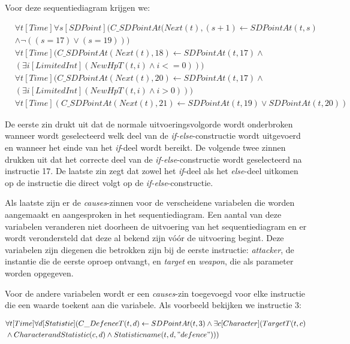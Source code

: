 Voor deze sequentiediagram krijgen we:

\begin{align*}
	&\forall{t}[Time]\forall{s}[SDPoint](C\_SDPointAt(Next(t), (s+1) \leftarrow SDPointAt(t, s) \\ &\land \lnot{}((s = 17) \lor (s = 19))) \\
	&\forall{t}[Time](C\_SDPointAt(Next(t), 18) \leftarrow SDPointAt(t, 17) \land \\ &(\exists{i}[LimitedInt](NewHpT(t, i) \land i <= 0))) \\
	&\forall{t}[Time](C\_SDPointAt(Next(t), 20) \leftarrow SDPointAt(t, 17 ) \land \\ &(\exists{i}[LimitedInt](NewHpT(t, i) \land i > 0))) \\
	&\forall{t}[Time](C\_SDPointAt(Next(t), 21) \leftarrow SDPointAt(t, 19) \lor SDPointAt(t, 20))
\end{align*}

De eerste zin drukt uit dat de normale uitvoeringsvolgorde wordt onderbroken wanneer wordt geselecteerd welk deel van de \textit{if-else}-constructie wordt uitgevoerd en wanneer het einde van het \textit{if}-deel wordt bereikt. De volgende twee zinnen drukken uit dat het correcte deel van de \textit{if-else}-constructie wordt geselecteerd na instructie 17. De laatste zin zegt dat zowel het \textit{if}-deel als het \textit{else}-deel uitkomen op de instructie die direct volgt op de \textit{if-else}-constructie.

\parbreak

Als laatste zijn er de \textit{causes}-zinnen voor de verscheidene variabelen die worden aangemaakt en aangesproken in het sequentiediagram. Een aantal van deze variabelen veranderen niet doorheen de uitvoering van het sequentiediagram en er wordt verondersteld dat deze al bekend zijn v\'o\'or de uitvoering begint. Deze variabelen zijn diegenen die betrokken zijn bij de eerste instructie: \textit{attacker}, de instantie die de eerste oproep ontvangt, en \textit{target} en \textit{weapon}, die als parameter worden opgegeven.

Voor de andere variabelen wordt er een \textit{causes}-zin toegevoegd voor elke instructie die een waarde toekent aan die variabele. Als voorbeeld bekijken we instructie 3:

\begin{align*}
	&\forall{t}[Time]\forall{d}[Statistic](C\_DefenceT(t, d) \leftarrow SDPointAt(t, 3) \land \exists{c}[Character](TargetT(t, c) \\ &\land CharacterandStatistic(c, d) \land Statisticname(t, d, "defence")))
\end{align*}


